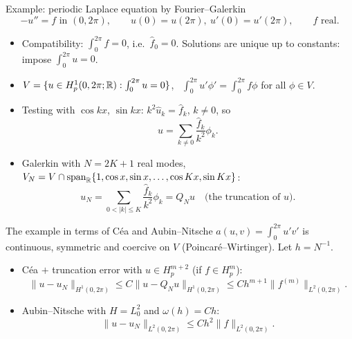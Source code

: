\begin{frame}{Example: periodic Laplace equation by Fourier--Galerkin}
    \[
        -u'' = f \text{ in } (0,2\pi), \qquad u(0) = u(2\pi),\ u'(0) = u'(2\pi), \qquad f \text{ real}.
    \]
    \begin{itemize}
        \item Compatibility: $\int_0^{2\pi} f = 0$, i.e.\ $\hat f_0 = 0$. Solutions are unique up to constants: impose $\int_0^{2\pi} u = 0$.
        \item $V = \{u \in H^1_p(0,2\pi;{\mathbb R}) : \int_0^{2\pi} u = 0\}$, \ $\int_0^{2\pi} u'\phi' = \int_0^{2\pi} f \phi$ for all $\phi \in V$.
        \item Testing with $\cos kx$, $\sin kx$: \quad $k^2 \hat u_k = \hat f_k$, $k \ne 0$, so
              \[
                  u = \sum_{k \ne 0} \frac{\hat f_k}{k^2} \phi_k .
              \]
        \item Galerkin with $N = 2K+1$ real modes, $V_N = V \cap \operatorname{span}_{\mathbb R}\{1, \cos x, \sin x, \dots, \cos Kx, \sin Kx\}$:
              \[
                  u_N = \sum_{0 < |k| \le K} \frac{\hat f_k}{k^2} \phi_k = Q_N u \quad \text{(the truncation of } u\text{)}.
              \]
    \end{itemize}
\end{frame}

\begin{frame}{The example in terms of Céa and Aubin--Nitsche}
    $a(u,v) = \int_0^{2\pi} u'v'$ is continuous, symmetric and coercive on $V$ (Poincaré--Wirtinger). Let $h = N^{-1}$.
    \begin{itemize}
        \item Céa $+$ truncation error with $u \in H^{m+2}_p$ (if $f \in H^m_p$):
              \[
                  \|u - u_N\|_{H^1(0,2\pi)} \le C \|u - Q_N u\|_{H^1(0,2\pi)} \le C h^{m+1} \|f^{(m)}\|_{L^2(0,2\pi)} .
              \]
        \item Aubin--Nitsche with $H = L^2_0$ and $\omega(h) = Ch$:
              \[
                  \|u - u_N\|_{L^2(0,2\pi)} \le C h^2 \|f\|_{L^2(0,2\pi)} .
              \]
    \end{itemize}
\end{frame}

